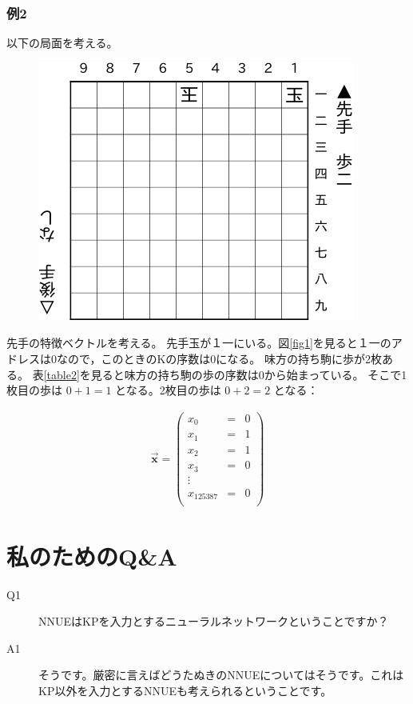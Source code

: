 \documentclass[11pt,a4paper]{ltjsarticle}
\begin{document}
\subsubsection*{例2}

以下の局面を考える。

\nopagebreak
\begin{figure}[H]
  \centering
  \includegraphics{fig/fig3.pdf}
\end{figure}

先手の特徴ベクトルを考える。
先手玉が１一にいる。図\ref{fig1}を見ると１一のアドレスは0なので，このときのKの序数は0になる。
味方の持ち駒に歩が2枚ある。
表\ref{table2}を見ると味方の持ち駒の歩の序数は0から始まっている。
そこで1枚目の歩は $0 + 1 = 1$ となる。2枚目の歩は $0 + 2 = 2$ となる：

\begin{eqnarray*}
    \vec{\bm{x}}
    =
    \begin{pmatrix}
        x_{0}  &=& 0 \\
        x_{1}  &=& 1 \\
        x_{2}  &=& 1 \\
        x_{3}  &=& 0 \\
        \vdots       \\
        x_{125387} &=& 0 \\
    \end{pmatrix}
\end{eqnarray*}




\section{私のためのQ\&A}

\begin{description}
  \item[Q1] NNUEはKPを入力とするニューラルネットワークということですか？
  \item[A1] そうです。厳密に言えばどうたぬきのNNUEについてはそうです。これはKP以外を入力とするNNUEも考えられるということです。
\end{description}
\end{document}
